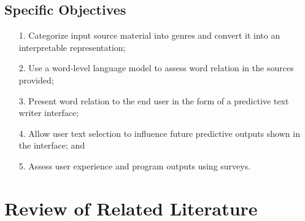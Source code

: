 \documentclass[journal]{./IEEE/IEEEtran}
\begin{document}
\subsection{Specific Objectives}
\begin{enumerate}{}

\item[1.] Categorize input source material into genres and convert it into an interpretable representation;

\item[2.] Use a word-level language model to assess word relation in the sources provided;

\item[3.] Present word relation to the end user in the form of a predictive text writer interface;

\item[4.] Allow user text selection to influence future predictive outputs shown in the interface; and

\item[5.] Assess user experience and program outputs using surveys.







\end{enumerate}

\section{Review of Related Literature}

\end{document}
